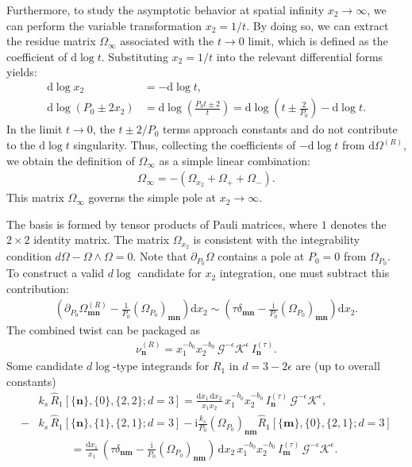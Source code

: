 \documentclass[a4paper,12pt]{article}
\newcommand{\n}{\nonumber}
\def\di{{\mathrm{d}}}
\def\ii{\mathrm{i}}
\def\ep{\epsilon}
\newcommand{\mG}{\mathcal{G}}
\newcommand{\mK}{\mathcal{K}}
\def\to{\rightarrow}
\begin{document}
Furthermore, to study the asymptotic behavior at spatial infinity $x_2 \to \infty$, we can perform the variable transformation $x_2 = 1/t$. By doing so, we can extract the residue matrix $\Omega_\infty$ associated with the $t \to 0$ limit, which is defined as the coefficient of $\di\log t$. Substituting $x_2 = 1/t$ into the relevant differential forms yields:
\begin{align}
	\di\log x_2 &= -\di\log t, \n\\
	\di\log(P_0 \pm 2x_2) &= \di\log\left(\frac{P_0 t \pm 2}{t}\right) = \di\log\left(t \pm \frac{2}{P_0}\right) - \di\log t.
\end{align}
In the limit $t \to 0$, the $t \pm 2/P_0$ terms approach constants and do not contribute to the $\di\log t$ singularity. Thus, collecting the coefficients of $-\di\log t$ from $\di\Omega^{(R)}$, we obtain the definition of $\Omega_\infty$ as a simple linear combination:
\begin{align}
	\Omega_\infty = - \left( \Omega_{x_2} + \Omega_{+} + \Omega_{-} \right).
\end{align}
This matrix $\Omega_\infty$ governs the simple pole at $x_2 \to \infty$.

The basis is formed by tensor products of Pauli matrices, where $1$ denotes the $2\times 2$ identity matrix.
The matrix $\Omega_{x_2}$ is consistent with the integrability condition $d\Omega - \Omega \wedge \Omega = 0$.
Note that $\partial_{P_0}\Omega$ contains a pole at $P_0=0$ from $\Omega_{P_0}$. To construct a valid $d\log$ candidate for $x_2$ integration, one must subtract this contribution:
\begin{align}
	\left(\partial_{P_0}\Omega^{(R)}_{\bm m\bm n} - \frac{1}{P_0}(\Omega_{P_0})_{\bm m\bm n}\right) \di x_2 \sim \left( \tau\delta_{\bm m\bm n} - \frac{\ii}{P_0}(\Omega_{P_0})_{\bm m\bm n}\right) \di x_2.
\end{align}
The combined twist can be packaged as
\begin{align}
	\nu^{(R)}_{\bm n} = x_1^{-b_0}x_2^{-b_0}\,\mG^{-\ep}\mK^{\ep}\,I^{(\tau)}_{\bm n}.
\end{align}
Some candidate $d\log$-type integrands for $R_1$ in $d=3-2\ep$ are (up to overall constants)
\begin{align}
&	k_s\,\hat{R}_1[\{\bm n\},\{0\},\{2,2\};d=3] = \frac{\di x_1\,\di x_2}{x_1 x_2}\,x_1^{-b_0}x_2^{-b_0}\,I^{(\tau)}_{\bm n}\,\mG^{-\ep}\mK^{\ep}, \n\\
-	& k_s\,\hat{R}_1[\{\bm n\},\{1\},\{2,1\};d=3] -   \ii	\frac{k_s}{P_0} (\Omega_{P_0})_{\bm n\bm m} \hat{R}_1[\{\bm m\},\{0\},\{2,1\};d=3]     \n\\
& ~~~~~~~~~~~~~= \frac{\di x_1}{x_1}\,\left(\tau\delta_{\bm n\bm m} - \frac{\ii}{P_0}(\Omega_{P_0})_{\bm n\bm m}\right)\,\di x_2 \,x_1^{-b_0}x_2^{-b_0}\,I^{(\tau)}_{\bm m}\,\mG^{-\ep}\mK^{\ep}.
\end{align}
\end{document}
